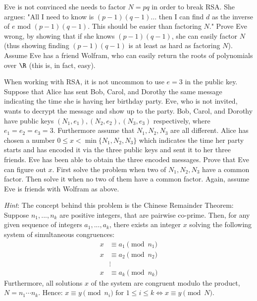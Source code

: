 
\begin{Parts}
    \Part Eve is not convinced she needs to factor $N = pq$ in order to break
    RSA.
    She argues: "All I need to know is $(p-1)(q-1)$... then I can find $d$
as the inverse of $e$ mod $(p-1)(q-1)$. This should be easier than
factoring $N$."
Prove Eve wrong, by showing that if she knows $(p-1)(q-1)$,
she can easily factor $N$ (thus showing finding $(p-1)(q-1)$ is at least
as hard as factoring $N$). Assume Eve has a friend Wolfram, who can easily return the
roots of polynomials over $\R$ (this is, in fact, easy).

    \Part When working with RSA, it is not uncommon to use $e=3$ in the public
    key. Suppose that Alice has sent Bob, Carol, and Dorothy the same
    message indicating the time she is having her birthday party. Eve, who is
    not invited, wants to decrypt the message and show up to the
    party.
    Bob, Carol, and Dorothy have public keys $(N_1, e_1), (N_2, e_2), (N_3,
    e_3)$ respectively, where $e_1=e_2=e_3=3$. Furthermore assume that $N_1,N_2,N_3$ are
    all different. Alice has chosen a number $0\leq x< \min\{N_1,N_2,N_3\}$ which
    indicates the time her party starts and has encoded it via the three
    public keys and sent it to her three friends. Eve has been able to
    obtain the three encoded messages. Prove that Eve can figure out $x$.
    First solve the problem when two of $N_1,N_2,N_3$ have a
    common factor. Then solve it when no two of them have a common factor.
    Again, assume Eve is friends with Wolfram as above.
    
    
    \textit{Hint}: The concept behind this problem is the Chinese Remainder Theorem:
    Suppose $n_1, ...,n_k$ are positive integers, that are pairwise co-prime.
    Then, for any given sequence of integers $a_1, ..., a_k$, there exists an
    integer $x$ solving the following system of simultaneous congruences:
    \begin{align*}
        x &\equiv a_1 \pmod{n_1} \\ 
        x &\equiv a_2 \pmod{n_2} \\ 
        &\vdots \\ 
        x &\equiv a_k \pmod{n_k} 
    \end{align*}
    Furthermore, all solutions $x$ of the system are congruent modulo 
    the product, $N=n_1 \dotsm n_k$. Hence:
    $x \equiv y \pmod{n_i} \text{ for } 1 \leq i \leq k \iff 
        x \equiv y \pmod N $.
\end{Parts}


